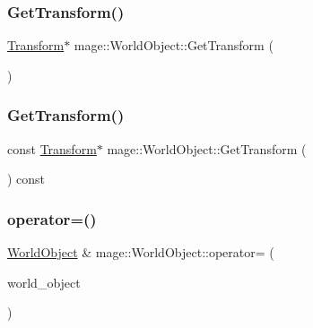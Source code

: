 \hypertarget{classmage_1_1_world_object_a4add48c19a884f5feaddc202c8266e9d}{}\label{classmage_1_1_world_object_a4add48c19a884f5feaddc202c8266e9d} 
\subsubsection{\texorpdfstring{Get\+Transform()}{GetTransform()}\hspace{0.1cm}{\footnotesize\ttfamily [1/2]}}
{\footnotesize\ttfamily \hyperlink{structmage_1_1_transform}{Transform}$\ast$ mage\+::\+World\+Object\+::\+Get\+Transform (\begin{DoxyParamCaption}{ }\end{DoxyParamCaption})}

\hypertarget{classmage_1_1_world_object_a15517a1962c5eb33de5fd3da4b4afe12}{}\label{classmage_1_1_world_object_a15517a1962c5eb33de5fd3da4b4afe12} 
\subsubsection{\texorpdfstring{Get\+Transform()}{GetTransform()}\hspace{0.1cm}{\footnotesize\ttfamily [2/2]}}
{\footnotesize\ttfamily const \hyperlink{structmage_1_1_transform}{Transform}$\ast$ mage\+::\+World\+Object\+::\+Get\+Transform (\begin{DoxyParamCaption}{ }\end{DoxyParamCaption}) const}

\hypertarget{classmage_1_1_world_object_a0676dc2fde5791becae9547077c7db0c}{}\label{classmage_1_1_world_object_a0676dc2fde5791becae9547077c7db0c} 
\subsubsection{\texorpdfstring{operator=()}{operator=()}\hspace{0.1cm}{\footnotesize\ttfamily [1/2]}}
{\footnotesize\ttfamily \hyperlink{classmage_1_1_world_object}{World\+Object} \& mage\+::\+World\+Object\+::operator= (\begin{DoxyParamCaption}\item[{const \hyperlink{classmage_1_1_world_object}{World\+Object} \&}]{world\+\_\+object }\end{DoxyParamCaption})}

